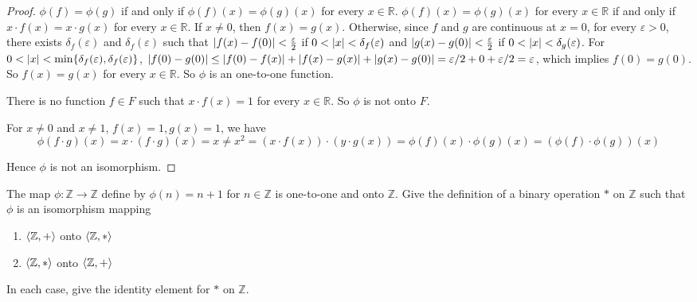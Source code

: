 \begin{proof}
    $\phi(f) = \phi(g)$ if and only if $\phi(f)(x) = \phi(g)(x)$ for every $x\in\mathbb{R}$. $\phi(f)(x) = \phi(g)(x)$ for every $x\in\mathbb{R}$ if and only if $x\cdot f(x) = x\cdot g(x)$ for every $x\in\mathbb{R}$. If $x\ne 0$, then $f(x) = g(x)$. Otherwise, since $f$ and $g$ are continuous at $x = 0$, for every $\varepsilon > 0$, there exists $\delta_{f}(\varepsilon)$ and $\delta_{f}(\varepsilon)$ such that $\left\vert{f(x) - f(0)}\right\vert < \frac{\varepsilon}{2}$ if $0 < \left\vert{x}\right\vert < \delta_{f}(\varepsilon)$ and $\left\vert{g(x) - g(0)}\right\vert < \frac{\varepsilon}{2}$ if $0 < \left\vert{x}\right\vert < \delta_{g}(\varepsilon)$. For $0 < \left\vert{x}\right\vert < \min\{ \delta_{f}(\varepsilon), \delta_{f}(\varepsilon) \}$, $\left\vert{f(0) - g(0)}\right\vert\le \left\vert{f(0) - f(x)}\right\vert + \left\vert{f(x) - g(x)}\right\vert + \left\vert{g(x) - g(0)}\right\vert = \varepsilon/2 + 0 + \varepsilon/2 = \varepsilon$, which implies $f(0) = g(0)$. So $f(x) = g(x)$ for every $x\in\mathbb{R}$. So $\phi$ is an one-to-one function.

    There is no function $f\in F$ such that $x\cdot f(x) = 1$ for every $x\in\mathbb{R}$. So $\phi$ is not onto $F$.

    For $x\ne 0$ and $x\ne 1$, $f(x) = 1, g(x) = 1$, we have
    \[
        \phi(f\cdot g)(x) = x\cdot (f\cdot g)(x) = x \ne x^{2} = (x\cdot f(x))\cdot (y\cdot g(x)) = \phi(f)(x) \cdot \phi(g)(x) = (\phi(f)\cdot\phi(g))(x)
    \]

    Hence $\phi$ is not an isomorphism.
\end{proof}

\begin{exercise}
    The map $\phi: \mathbb{Z} \to \mathbb{Z}$ define by $\phi(n) = n + 1$ for $n\in\mathbb{Z}$ is one-to-one and onto $\mathbb{Z}$. Give the definition of a binary operation $*$ on $\mathbb{Z}$ such that $\phi$ is an isomorphism mapping
    \begin{enumerate}[label={\textbf{\alph*}},itemsep=0pt,topsep=0pt]
        \item $\left\langle{\mathbb{Z}, +}\right\rangle$ onto $\left\langle{\mathbb{Z}, *}\right\rangle$
        \item $\left\langle{\mathbb{Z}, *}\right\rangle$ onto $\left\langle{\mathbb{Z}, +}\right\rangle$
    \end{enumerate}

    In each case, give the identity element for $*$ on $\mathbb{Z}$.
\end{exercise}

